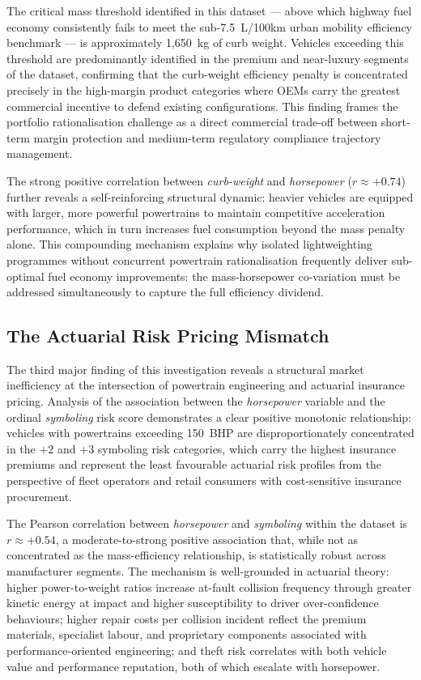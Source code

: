 \documentclass[conference]{IEEEtran}
\begin{document}
The critical mass threshold identified in this dataset — above which
highway fuel economy consistently fails to meet the sub-7.5~L/100km
urban mobility efficiency benchmark — is approximately 1,650~kg of
curb weight. Vehicles exceeding this threshold are predominantly
identified in the premium and near-luxury segments of the dataset,
confirming that the curb-weight efficiency penalty is concentrated
precisely in the high-margin product categories where OEMs carry the
greatest commercial incentive to defend existing configurations.
This finding frames the portfolio rationalisation challenge as a
direct commercial trade-off between short-term margin protection and
medium-term regulatory compliance trajectory management.

The strong positive correlation between \textit{curb-weight} and
\textit{horsepower} ($r \approx +0.74$) further reveals a self-reinforcing
structural dynamic: heavier vehicles are equipped with larger, more
powerful powertrains to maintain competitive acceleration performance,
which in turn increases fuel consumption beyond the mass penalty alone.
This compounding mechanism explains why isolated lightweighting
programmes without concurrent powertrain rationalisation frequently
deliver sub-optimal fuel economy improvements: the mass-horsepower
co-variation must be addressed simultaneously to capture the full
efficiency dividend.

\subsection{The Actuarial Risk Pricing Mismatch}

The third major finding of this investigation reveals a structural
market inefficiency at the intersection of powertrain engineering and
actuarial insurance pricing. Analysis of the association between the
\textit{horsepower} variable and the ordinal \textit{symboling} risk
score demonstrates a clear positive monotonic relationship: vehicles
with powertrains exceeding 150~BHP are disproportionately concentrated
in the $+2$ and $+3$ symboling risk categories, which carry the highest
insurance premiums and represent the least favourable actuarial risk
profiles from the perspective of fleet operators and retail consumers
with cost-sensitive insurance procurement.

The Pearson correlation between \textit{horsepower} and
\textit{symboling} within the dataset is $r \approx +0.54$,
a moderate-to-strong positive association that, while not as
concentrated as the mass-efficiency relationship, is statistically
robust across manufacturer segments. The mechanism is well-grounded
in actuarial theory: higher power-to-weight ratios increase at-fault
collision frequency through greater kinetic energy at impact and
higher susceptibility to driver over-confidence behaviours; higher
repair costs per collision incident reflect the premium materials,
specialist labour, and proprietary components associated with
performance-oriented engineering; and theft risk correlates with
both vehicle value and performance reputation, both of which escalate
with horsepower.
\end{document}

